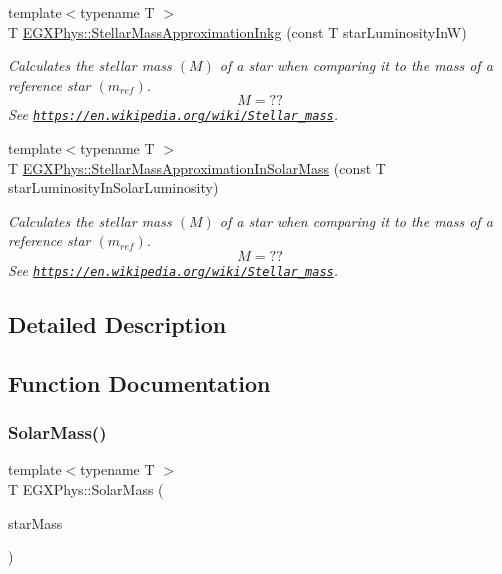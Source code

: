\begin{DoxyCompactItemize}
{\footnotesize template$<$typename T $>$ }\\T \mbox{\hyperlink{group___e_g_x_phys-_stellar_mass_ga1863cc210a7e0aa0c681774e719fcd21}{E\+G\+X\+Phys\+::\+Stellar\+Mass\+Approximation\+Inkg}} (const T star\+Luminosity\+InW)
\begin{DoxyCompactList}\small\item\em Calculates the stellar mass $(M)$ of a star when comparing it to the mass of a reference star $(m_{ref})$. \[M=??\] See \href{https://en.wikipedia.org/wiki/Stellar_mass}{\tt https\+://en.\+wikipedia.\+org/wiki/\+Stellar\+\_\+mass}. \end{DoxyCompactList}\item 
{\footnotesize template$<$typename T $>$ }\\T \mbox{\hyperlink{group___e_g_x_phys-_stellar_mass_ga8d4792aff66d53698461f73b1d25e3cc}{E\+G\+X\+Phys\+::\+Stellar\+Mass\+Approximation\+In\+Solar\+Mass}} (const T star\+Luminosity\+In\+Solar\+Luminosity)
\begin{DoxyCompactList}\small\item\em Calculates the stellar mass $(M)$ of a star when comparing it to the mass of a reference star $(m_{ref})$. \[M=??\] See \href{https://en.wikipedia.org/wiki/Stellar_mass}{\tt https\+://en.\+wikipedia.\+org/wiki/\+Stellar\+\_\+mass}. \end{DoxyCompactList}\end{DoxyCompactItemize}


\subsection{Detailed Description}


\subsection{Function Documentation}
\mbox{\label{group___e_g_x_phys-_stellar_mass_ga4988f903a27ec9cfa63f72b003d876fd}} 
\subsubsection{\texorpdfstring{Solar\+Mass()}{SolarMass()}}
{\footnotesize\ttfamily template$<$typename T $>$ \\
T E\+G\+X\+Phys\+::\+Solar\+Mass (\begin{DoxyParamCaption}\item[{const T}]{star\+Mass }\end{DoxyParamCaption})}



